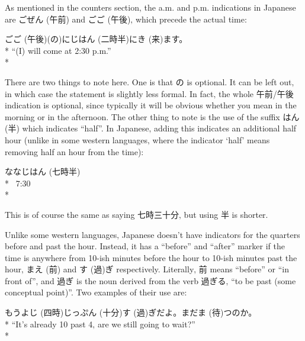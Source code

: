 \documentclass[11pt, b5paper, twoside, openright, onecolumn]{book}
\makeatletter
\newcommand*{\rubystack}[2]{{\relscale{0.5}%
  \begin{tabular}[b]{@{}c@{}}%
    {#1}\\%
   {\textscale{2}{#2}}%
  \end{tabular}}%
}
\DeclareRobustCommand*{\ruby}[2]{%
  \mbox{%
    \setlength{\parskip}{0ex}%
    \BeginAccSupp{method=pdfstringdef,ActualText={#1}}%
      \rubystack{\phantom{#2}}{#1}%
      \llap{%
        \rubystack{#2}{\phantom{#1}}%
      }%
    \EndAccSupp{}%
  }%
}
\renewcommand*{\ruby}[2]{#2 (#1)}%
\newenvironment{exampleblock}{
\setlength{\parindent}{0.6in}
\begin{minipage}[t]{\dimexpr\textwidth-\parindent}}
{\end{minipage}}
\makeatother
\begin{document}
As mentioned in the counters section‚ the a.m. and p.m. indications in Japanese are \ruby{午前}{ごぜん} and \ruby{午後}{ごご}‚ which precede the actual time:

\vspace{0.4cm}
\begin{exampleblock}
\ruby{午後}{ごご}(の)\ruby{二時半}{にじはん}に\ruby{来}{き}ます。 \\* 
“(I) will come at 2:30 p.m.” \\* 
\end{exampleblock}
\vspace{0.2cm}

There are two things to note here. One is that の is optional. It can be left out‚ in which case the statement is slightly less formal. In fact‚ the whole 午前/午後 indication is optional‚ since typically it will be obvious whether you mean in the morning or in the afternoon. The other thing to note is the use of the suffix \ruby{半}{はん} which indicates “half”. In Japanese‚ adding this indicates an additional half hour (unlike in some western languages‚ where the indicator ‘half’ means removing half an hour from the time):

\vspace{0.4cm}
\begin{exampleblock}
\ruby{七時半}{ななじはん} \\* 
 7:30 \\* 
\end{exampleblock}
\vspace{0.2cm}

This is of course the same as saying 七時三十分‚ but using 半 is shorter.

Unlike some western languages‚ Japanese doesn’t have indicators for the quarters before and past the hour. Instead‚ it has a “before” and “after” marker if the time is anywhere from 10-ish minutes before the hour to 10-ish minutes past the hour‚ \ruby{前}{まえ} and \ruby{過}{す}ぎ respectively. Literally‚ 前 means “before” or “in front of”‚ and 過ぎ is the noun derived from the verb 過ぎる‚ “to be past (some conceptual point)”. Two examples of their use are:

\vspace{0.4cm}
\begin{exampleblock}
もう\ruby{四時}{よじ}\ruby{十分}{じっぷん}\ruby{過}{す}ぎだよ。まだ\ruby{待}{ま}つのか。 \\* 
“It’s already 10 past 4‚ are we still going to wait?” \\* 
\end{exampleblock}
\vspace{0.2cm}
\end{document}
